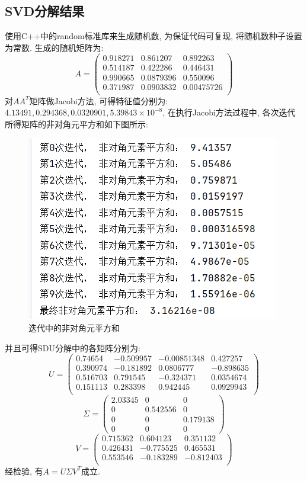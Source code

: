 \documentclass[12pt,a4paper,oneside]{article}
\begin{document}
\subsection{SVD分解结果}
使用C++中的random标准库来生成随机数, 为保证代码可复现, 将随机数种子设置为常数.
生成的随机矩阵为: 
$$A=
\left(
    \begin{matrix}
        0.918271 & 0.861207 & 0.892263\\
        0.514187 &  0.422286 & 0.446431 \\
        0.990665& 0.0879396& 0.550096\\
        0.371987& 0.0903832&0.00475726\\
    \end{matrix}
\right)$$
对$AA^T$矩阵做Jacobi方法, 可得特征值分别为:$4.13491, 0.294368, 0.0320901, 5.39843\times 10^{-8}$,
在执行Jacobi方法过程中, 各次迭代所得矩阵的非对角元平方和如下图所示:
\begin{figure}[H]
    \centering
    \includegraphics{figs/Jacobi.png}
    \caption{迭代中的非对角元平方和}
\end{figure}\par\noindent
并且可得SDU分解中的各矩阵分别为:
$$ U = 
\left(
    \begin{matrix}
        0.74654& -0.509957& -0.00851348& 0.427257\\
        0.390974& -0.181892& 0.0806777& -0.898635\\
        0.516703& 0.791545& -0.324371& 0.0354674\\ 
        0.151113& 0.283398& 0.942445& 0.0929943\\ 
    \end{matrix}
\right)
$$
$$ \Sigma = 
\left(
    \begin{matrix}
        2.03345 & 0 & 0\\
        0& 0.542556& 0\\
        0& 0& 0.179138\\
        0& 0& 0
    \end{matrix}
\right)
$$
$$ V = 
\left(
    \begin{matrix}
        0.715362& 0.604123& 0.351132\\
        0.426431& -0.775525& 0.465531\\ 
        0.553546& -0.183289& -0.812403\\ 
    \end{matrix}
\right)
$$
经检验, 有$A = U\Sigma V^T$成立.
\end{document}
